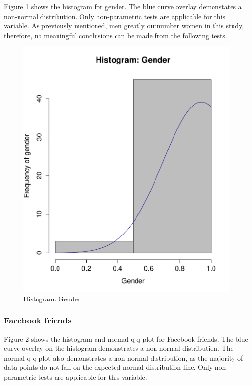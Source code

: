 Figure 1 shows the histogram for gender. The blue curve overlay demonstates a non-normal distribution. Only non-parametric tests are applicable for this variable. As previously mentioned, men greatly outnumber women in this study, therefore, no meaningful conclusions can be made from the following tests.

\begin{figure}[H]
\centering
\caption{Histogram: Gender}
\includegraphics[scale=0.35]{./img/hist_gender.pdf}
\end{figure}

\newpage
\subsubsection{Facebook friends}

Figure 2 shows the histogram and normal q-q plot for Facebook friends. The blue curve overlay on the histogram demonstrates a non-normal distribution. The normal q-q plot also demonstrates a non-normal distribution, as the majority of data-points do not fall on the expected normal distribution line. Only non-parametric tests are applicable for this variable.

